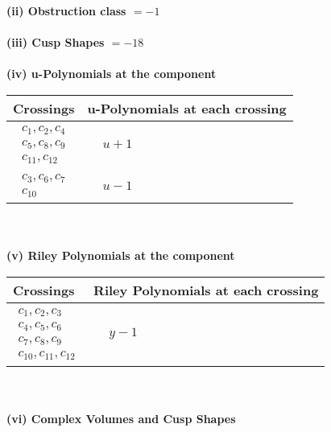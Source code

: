 \documentclass[1p]{elsarticle_modified}
\theoremstyle{definition}
\begin{document}
\flushleft \textbf{(ii) Obstruction class $= -1$}\\~\\
\flushleft \textbf{(iii) Cusp Shapes $= -18$}\\~\\
\newpage\renewcommand{\arraystretch}{1}
\flushleft \textbf{(iv) u-Polynomials at the component}\newline \\
\begin{tabular}{m{50pt}|m{274pt}}
Crossings & \hspace{64pt}u-Polynomials at each crossing \\
\hline $$\begin{aligned}c_{1},c_{2},c_{4}\\c_{5},c_{8},c_{9}\\c_{11},c_{12}\end{aligned}$$&$\begin{aligned}
&u+1
\end{aligned}$\\
\hline $$\begin{aligned}c_{3},c_{6},c_{7}\\c_{10}\end{aligned}$$&$\begin{aligned}
&u-1
\end{aligned}$\\
\hline
\end{tabular}\\~\\
\newpage\renewcommand{\arraystretch}{1}
\flushleft \textbf{(v) Riley Polynomials at the component}\newline \\
\begin{tabular}{m{50pt}|m{274pt}}
Crossings & \hspace{64pt}Riley Polynomials at each crossing \\
\hline $$\begin{aligned}c_{1},c_{2},c_{3}\\c_{4},c_{5},c_{6}\\c_{7},c_{8},c_{9}\\c_{10},c_{11},c_{12}\end{aligned}$$&$\begin{aligned}
&y-1
\end{aligned}$\\
\hline
\end{tabular}\\~\\
\newpage\flushleft \textbf{(vi) Complex Volumes and Cusp Shapes}
\end{document}
